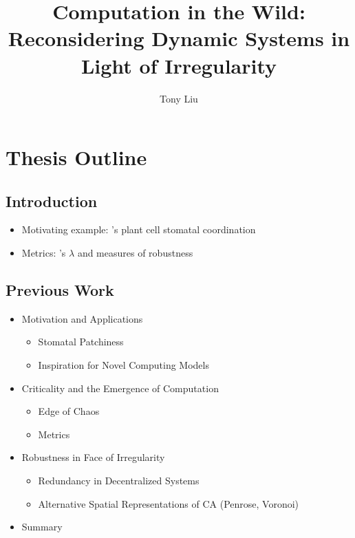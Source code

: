 \documentclass[a4paper, 11pt]{article}
\begin{document}
\title{Computation in the Wild: Reconsidering Dynamic Systems in Light of Irregularity}
\author{Tony Liu}
\maketitle

\section*{Thesis Outline}

\subsection*{Introduction}
\begin{itemize}
\item Motivating example: \citeauthor{pe04}'s plant cell stomatal coordination
\item Metrics: \citeauthor{la90}'s $\lambda$ and measures of robustness
\end{itemize}

\subsection*{Previous Work}
\begin{itemize}

\item Motivation and Applications
\begin{itemize}
\item Stomatal Patchiness
\item Inspiration for Novel Computing Models
\end{itemize}

\item Criticality and the Emergence of Computation
\begin{itemize}
\item Edge of Chaos
\item Metrics
\end{itemize}

\item Robustness in Face of Irregularity
\begin{itemize}
\item Redundancy in Decentralized Systems
\item Alternative Spatial Representations of CA (Penrose, Voronoi)
\end{itemize}
\item Summary

\end{itemize}
\end{document}
